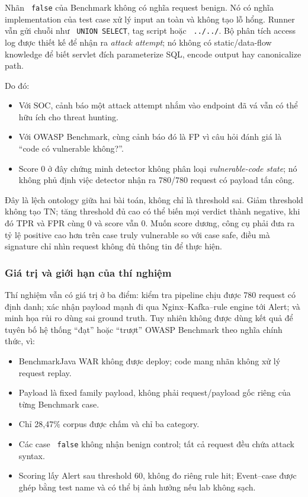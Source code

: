 \documentclass[runningheads]{report-template/llncs}
\newcommand{\code}[1]{\texttt{\small\hyphenchar\font=45 #1}}
\begin{document}
Nhãn \code{false} của Benchmark không có nghĩa request benign. Nó có
nghĩa implementation của test case xử lý input an toàn và không tạo lỗ
hổng. Runner vẫn gửi chuỗi như \code{UNION SELECT}, tag script hoặc
\code{../../}. Bộ phân tích access log được thiết kế để nhận ra
\emph{attack attempt}; nó không có static/data-flow knowledge để biết
servlet đích parameterize SQL, encode output hay canonicalize path.

Do đó:
\begin{itemize}
  \item Với SOC, cảnh báo một attack attempt nhắm vào endpoint đã vá vẫn
  có thể hữu ích cho threat hunting.
  \item Với OWASP Benchmark, cùng cảnh báo đó là FP vì câu hỏi đánh giá là
  ``code có vulnerable không?''.
  \item Score 0 ở đây chứng minh detector không phân loại
  \emph{vulnerable-code state}; nó không phủ định việc detector nhận ra
  780/780 request có payload tấn công.
\end{itemize}

Đây là lệch ontology giữa hai bài toán, không chỉ là threshold sai.
Giảm threshold không tạo TN; tăng threshold đủ cao có thể biến mọi verdict
thành negative, khi đó TPR và FPR cùng 0 và score vẫn 0. Muốn score dương,
công cụ phải đưa ra tỷ lệ positive cao hơn trên case truly vulnerable so
với case safe, điều mà signature chỉ nhìn request không đủ thông tin để
thực hiện.

\subsubsection{Giá trị và giới hạn của thí nghiệm}

Thí nghiệm vẫn có giá trị ở ba điểm: kiểm tra pipeline chịu được 780
request có định danh; xác nhận payload mạnh đi qua Nginx--Kafka--rule
engine tới Alert; và minh họa rủi ro dùng sai ground truth. Tuy nhiên
không được dùng kết quả để tuyên bố hệ thống ``đạt'' hoặc ``trượt'' OWASP
Benchmark theo nghĩa chính thức, vì:
\begin{itemize}
  \item BenchmarkJava WAR không được deploy; code mang nhãn không xử lý
  request replay.
  \item Payload là fixed family payload, không phải request/payload gốc
  riêng của từng Benchmark case.
  \item Chỉ 28,47\% corpus được chấm và chỉ ba category.
  \item Các case \code{false} không nhận benign control; tất cả request
  đều chứa attack syntax.
  \item Scoring lấy Alert sau threshold 60, không đo riêng rule hit;
  Event--case được ghép bằng test name và có thể bị ảnh hưởng nếu lab
  không sạch.
\end{itemize}
\end{document}
